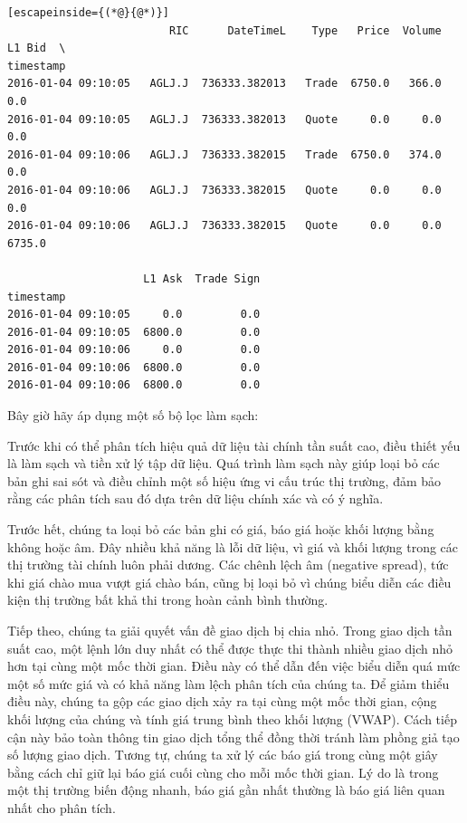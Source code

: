 \begin{lstlisting}[escapeinside={(*@}{@*)}]
                         RIC      DateTimeL    Type   Price  Volume  L1 Bid  \
timestamp                                                                     
2016-01-04 09:10:05   AGLJ.J  736333.382013   Trade  6750.0   366.0     0.0   
2016-01-04 09:10:05   AGLJ.J  736333.382013   Quote     0.0     0.0     0.0   
2016-01-04 09:10:06   AGLJ.J  736333.382015   Trade  6750.0   374.0     0.0   
2016-01-04 09:10:06   AGLJ.J  736333.382015   Quote     0.0     0.0     0.0   
2016-01-04 09:10:06   AGLJ.J  736333.382015   Quote     0.0     0.0  6735.0   

                     L1 Ask  Trade Sign  
timestamp                                
2016-01-04 09:10:05     0.0         0.0  
2016-01-04 09:10:05  6800.0         0.0  
2016-01-04 09:10:06     0.0         0.0  
2016-01-04 09:10:06  6800.0         0.0  
2016-01-04 09:10:06  6800.0         0.0  
\end{lstlisting}

Bây giờ hãy áp dụng một số bộ lọc làm sạch:

Trước khi có thể phân tích hiệu quả dữ liệu tài chính tần suất cao, điều thiết yếu là làm sạch và tiền xử lý tập dữ liệu. Quá trình làm sạch này giúp loại bỏ các bản ghi sai sót và điều chỉnh một số hiệu ứng vi cấu trúc thị trường, đảm bảo rằng các phân tích sau đó dựa trên dữ liệu chính xác và có ý nghĩa.

Trước hết, chúng ta loại bỏ các bản ghi có giá, báo giá hoặc khối lượng bằng không hoặc âm. Đây nhiều khả năng là lỗi dữ liệu, vì giá và khối lượng trong các thị trường tài chính luôn phải dương. Các chênh lệch âm (negative spread), tức khi giá chào mua vượt giá chào bán, cũng bị loại bỏ vì chúng biểu diễn các điều kiện thị trường bất khả thi trong hoàn cảnh bình thường.

Tiếp theo, chúng ta giải quyết vấn đề giao dịch bị chia nhỏ. Trong giao dịch tần suất cao, một lệnh lớn duy nhất có thể được thực thi thành nhiều giao dịch nhỏ hơn tại cùng một mốc thời gian. Điều này có thể dẫn đến việc biểu diễn quá mức một số mức giá và có khả năng làm lệch phân tích của chúng ta. Để giảm thiểu điều này, chúng ta gộp các giao dịch xảy ra tại cùng một mốc thời gian, cộng khối lượng của chúng và tính giá trung bình theo khối lượng (VWAP). Cách tiếp cận này bảo toàn thông tin giao dịch tổng thể đồng thời tránh làm phồng giả tạo số lượng giao dịch.
Tương tự, chúng ta xử lý các báo giá trong cùng một giây bằng cách chỉ giữ lại báo giá cuối cùng cho mỗi mốc thời gian. Lý do là trong một thị trường biến động nhanh, báo giá gần nhất thường là báo giá liên quan nhất cho phân tích.

